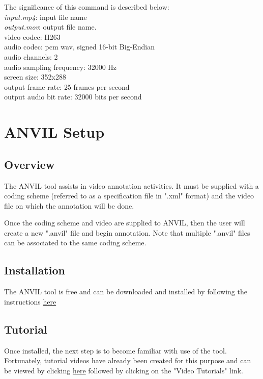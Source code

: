 \documentclass[]{article}
\begin{document}
\noindent The significance of this command is described below: \\

\noindent \emph{input.mp4}: input file name \\
\emph{output.mov}: output file name. \\
video codec: H263 \\
audio codec: pcm wav, signed 16-bit Big-Endian \\
audio channels: 2 \\
audio sampling frequency: 32000 Hz \\
screen size: 352x288 \\
output frame rate: 25 frames per second \\
output audio bit rate: 32000 bits per second \\

\section{ANVIL Setup}
\subsection{Overview} 
The ANVIL tool assists in video annotation activities. It must be supplied with a coding scheme (referred to as a specification file in ".xml" format) and the video file on which the annotation will be done.

Once the coding scheme and video are supplied to ANVIL, then the user will create a new ".anvil" file and begin annotation. Note that multiple ".anvil" files can be associated to the same coding scheme.

\subsection{Installation}
The ANVIL tool is free and can be downloaded and installed by following the instructions \href{http://www.anvil-software.org/download/index.html}{here}

\subsection{Tutorial}
Once installed, the next step is to become familiar with use of the tool. Fortunately, tutorial videos have already been created for this purpose and can be viewed by clicking \href{http://www.anvil-software.org}{here} followed by clicking on the "Video Tutorials" link. 
\end{document}
